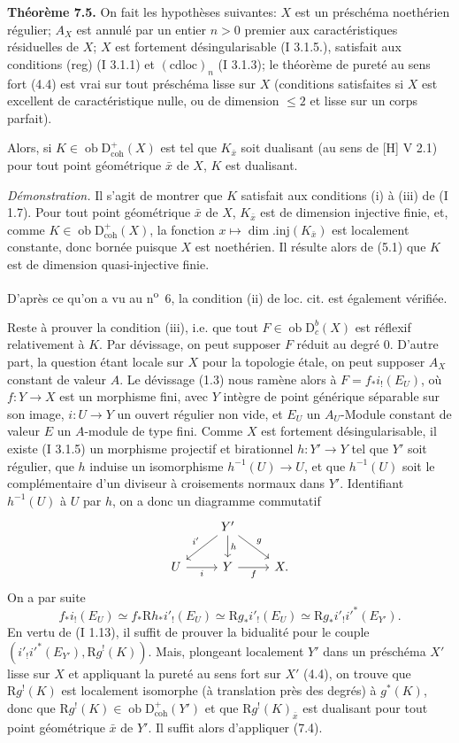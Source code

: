\documentclass[11pt]{article}
\newcommand{\R}{\mathrm{R}}
\newcommand{\D}{\mathrm{D}}
\newcommand{\ob}{\operatorname{ob}}
\providecommand{\ob}{\operatorname{ob}}
\providecommand{\R}{\mathrm R}
\begin{document}
\textbf{Théorème 7.5.} On fait les hypothèses suivantes: $X$ est un préschéma noethérien régulier; $A_X$ est annulé par un entier $n>0$ premier aux caractéristiques résiduelles de $X$; $X$ est fortement désingularisable (I 3.1.5.), satisfait aux conditions (reg) (I 3.1.1) et $(\mathrm{cdloc})_n$ (I 3.1.3); le théorème de pureté au sens fort (4.4) est vrai sur tout préschéma lisse sur $X$ (conditions satisfaites si $X$ est excellent de caractéristique nulle, ou de dimension $\leq2$ et lisse sur un corps parfait).

Alors, si $K\in\ob\D^{+}_{\mathrm{coh}}(X)$ est tel que $K_{\bar{x}}$ soit dualisant (au sens de [H] V 2.1) pour tout point géométrique $\bar{x}$ de $X$, $K$ est dualisant.

\emph{Démonstration.} Il s'agit de montrer que $K$ satisfait aux conditions (i) à (iii) de (I 1.7). Pour tout point géométrique $\bar{x}$ de $X$, $K_{\bar{x}}$ est de dimension injective finie, et, comme $K\in\ob\D^{+}_{\mathrm{coh}}(X)$, la fonction $x\mapsto \dim.\mathrm{inj}(K_{\bar{x}})$ est localement constante, donc bornée puisque $X$ est noethérien. Il résulte alors de (5.1) que $K$ est de dimension quasi-injective finie.

D'après ce qu'on a vu au n\textsuperscript{o}~6, la condition (ii) de loc. cit. est également vérifiée.

Reste à prouver la condition (iii), i.e. que tout $F\in\ob\D_c^b(X)$ est réflexif relativement à $K$. Par dévissage, on peut supposer $F$ réduit au degré $0$. D'autre part, la question étant locale sur $X$ pour la topologie étale, on peut supposer $A_X$ constant de valeur $A$. Le dévissage (1.3) nous ramène alors à $F=f_*i_!(E_U)$, où $f:Y\to X$ est un morphisme fini, avec $Y$ intègre de point générique séparable sur son image, $i:U\to Y$ un ouvert régulier non vide, et $E_U$ un $A_U$-Module constant de valeur $E$ un $A$-module de type fini. Comme $X$ est fortement désingularisable, il existe (I 3.1.5) un morphisme projectif et birationnel $h:Y'\to Y$ tel que $Y'$ soit régulier, que $h$ induise un isomorphisme $h^{-1}(U)\to U$, et que $h^{-1}(U)$ soit le complémentaire d'un diviseur à croisements normaux dans $Y'$. Identifiant $h^{-1}(U)$ à $U$ par $h$, on a donc un diagramme commutatif
\[
\begin{tikzcd}
& Y' \arrow[dl,"i'"'] \arrow[d,"h"] \arrow[dr,"g"] & \\
U \arrow[r,"i"'] & Y \arrow[r,"f"'] & X.
\end{tikzcd}
\]
On a par suite
\[
        f_*i_!(E_U)\simeq f_*\R h_* i'_!(E_U)\simeq \R g_* i'_!(E_U)\simeq \R g_* i'_! i'^*(E_{Y'}).
\]
En vertu de (I 1.13), il suffit de prouver la bidualité pour le couple $(i'_!i'^*(E_{Y'}),\R g^!(K))$. Mais, plongeant localement $Y'$ dans un préschéma $X'$ lisse sur $X$ et appliquant la pureté au sens fort sur $X'$ (4.4), on trouve que $\R g^!(K)$ est localement isomorphe (à translation près des degrés) à $g^*(K)$, donc que $\R g^!(K)\in\ob\D^{+}_{\mathrm{coh}}(Y')$ et que $\R g^!(K)_{\bar{x}}$ est dualisant pour tout point géométrique $\bar{x}$ de $Y'$. Il suffit alors d'appliquer (7.4).
\end{document}
